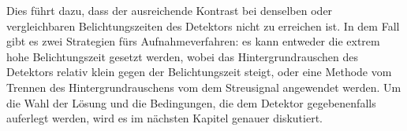 \noindent
Dies führt dazu, dass der ausreichende Kontrast bei denselben oder vergleichbaren Belichtungszeiten des Detektors nicht zu erreichen ist. In dem Fall gibt es zwei Strategien fürs Aufnahmeverfahren: es kann entweder die extrem hohe Belichtungszeit gesetzt werden, wobei das Hintergrundrauschen des Detektors relativ klein gegen der Belichtungszeit steigt, oder eine Methode vom Trennen des Hintergrundrauschens vom dem Streusignal angewendet werden. Um die Wahl der Lösung und die Bedingungen, die dem Detektor gegebenenfalls auferlegt werden, wird es im nächsten Kapitel genauer diskutiert. 

